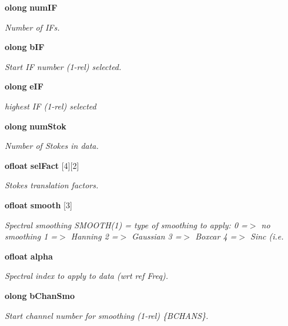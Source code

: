 \begin{CompactItemize}
{\bf olong} {\bf num\-IF}
\begin{CompactList}\small\item\em Number of IFs. \item\end{CompactList}\item 
{\bf olong} {\bf b\-IF}
\begin{CompactList}\small\item\em Start IF number (1-rel) selected. \item\end{CompactList}\item 
{\bf olong} {\bf e\-IF}
\begin{CompactList}\small\item\em highest IF (1-rel) selected \item\end{CompactList}\item 
{\bf olong} {\bf num\-Stok}
\begin{CompactList}\small\item\em Number of Stokes in data. \item\end{CompactList}\item 
{\bf ofloat} {\bf sel\-Fact} [4][2]
\begin{CompactList}\small\item\em Stokes translation factors. \item\end{CompactList}\item 
{\bf ofloat} {\bf smooth} [3]
\begin{CompactList}\small\item\em Spectral smoothing SMOOTH(1) = type of smoothing to apply: 0 =$>$ no smoothing 1 =$>$ Hanning 2 =$>$ Gaussian 3 =$>$ Boxcar 4 =$>$ Sinc (i.e. \item\end{CompactList}\item 
{\bf ofloat} {\bf alpha}
\begin{CompactList}\small\item\em Spectral index to apply to data (wrt ref Freq). \item\end{CompactList}\item 
{\bf olong} {\bf b\-Chan\-Smo}
\begin{CompactList}\small\item\em Start channel number for smoothing (1-rel) \{BCHANS\}. \item\end{CompactList}\item 

\end{CompactItemize}
